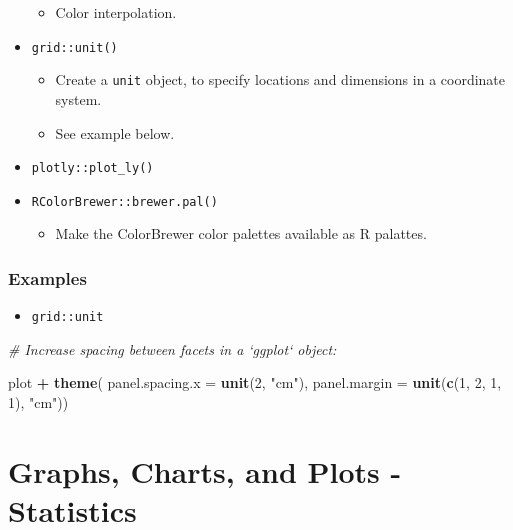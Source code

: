 \documentclass[
]{book}
\newenvironment{Shaded}{\begin{snugshade}}{\end{snugshade}}
\newcommand{\CommentTok}[1]{\textcolor[rgb]{0.56,0.35,0.01}{\textit{#1}}}
\newcommand{\DataTypeTok}[1]{\textcolor[rgb]{0.13,0.29,0.53}{#1}}
\newcommand{\DecValTok}[1]{\textcolor[rgb]{0.00,0.00,0.81}{#1}}
\newcommand{\KeywordTok}[1]{\textcolor[rgb]{0.13,0.29,0.53}{\textbf{#1}}}
\newcommand{\NormalTok}[1]{#1}
\newcommand{\OperatorTok}[1]{\textcolor[rgb]{0.81,0.36,0.00}{\textbf{#1}}}
\newcommand{\StringTok}[1]{\textcolor[rgb]{0.31,0.60,0.02}{#1}}
\providecommand{\tightlist}{%
  \setlength{\itemsep}{0pt}\setlength{\parskip}{0pt}}
\begin{document}
\begin{itemize}
  \begin{itemize}
  \tightlist
  \item
    Color interpolation.
  \end{itemize}
\item
  \texttt{grid::unit()}

  \begin{itemize}
  \tightlist
  \item
    Create a \texttt{unit} object, to specify locations and dimensions in a coordinate system.
  \item
    See example below.
  \end{itemize}
\item
  \texttt{plotly::plot\_ly()}
\item
  \texttt{RColorBrewer::brewer.pal()}

  \begin{itemize}
  \tightlist
  \item
    Make the ColorBrewer color palettes available as R palattes.
  \end{itemize}
\end{itemize}

\hypertarget{examples-2}{%
\subsubsection{Examples}\label{examples-2}}

\begin{itemize}
\tightlist
\item
  \texttt{grid::unit}
\end{itemize}

\begin{Shaded}
\begin{Highlighting}[]
\CommentTok{# Increase spacing between facets in a `ggplot` object:}

\NormalTok{plot }\OperatorTok{+}\StringTok{ }
\StringTok{  }\KeywordTok{theme}\NormalTok{(}
    \DataTypeTok{panel.spacing.x =} \KeywordTok{unit}\NormalTok{(}\DecValTok{2}\NormalTok{, }\StringTok{"cm"}\NormalTok{),}
    \DataTypeTok{panel.margin =} \KeywordTok{unit}\NormalTok{(}\KeywordTok{c}\NormalTok{(}\DecValTok{1}\NormalTok{, }\DecValTok{2}\NormalTok{, }\DecValTok{1}\NormalTok{, }\DecValTok{1}\NormalTok{), }\StringTok{"cm"}\NormalTok{))}
\end{Highlighting}
\end{Shaded}

\hypertarget{graphs-charts-and-plots---statistics}{%
\section{Graphs, Charts, and Plots - Statistics}\label{graphs-charts-and-plots---statistics}}
\end{document}
